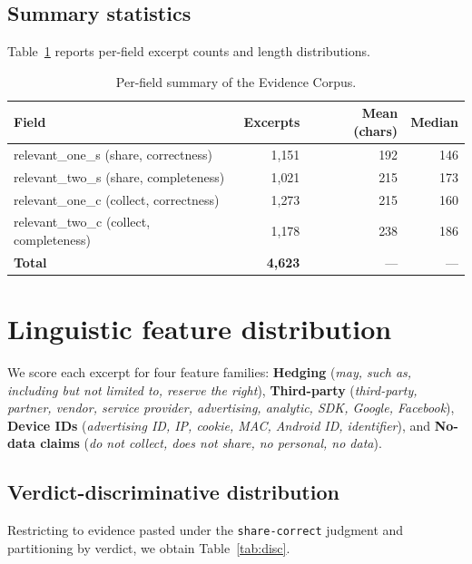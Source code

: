 \documentclass[11pt,a4paper]{article}
\begin{document}
\subsection{Summary statistics}
Table~\ref{tab:corpus} reports per-field excerpt counts and length
distributions.

\begin{table}[t]
\centering\small
\caption{Per-field summary of the Evidence Corpus.}
\label{tab:corpus}
\begin{tabular}{lrrr}
\toprule
Field & Excerpts & Mean (chars) & Median \\
\midrule
relevant\_one\_s (share, correctness)  & 1{,}151 & 192 & 146 \\
relevant\_two\_s (share, completeness) & 1{,}021 & 215 & 173 \\
relevant\_one\_c (collect, correctness)  & 1{,}273 & 215 & 160 \\
relevant\_two\_c (collect, completeness) & 1{,}178 & 238 & 186 \\
\midrule
\textbf{Total}                          & \textbf{4{,}623} & --- & --- \\
\bottomrule
\end{tabular}
\end{table}

\section{Linguistic feature distribution}
We score each excerpt for four feature families:
\textbf{Hedging} (\emph{may, such as, including but not limited to,
reserve the right}),
\textbf{Third-party} (\emph{third-party, partner, vendor, service
provider, advertising, analytic, SDK, Google, Facebook}),
\textbf{Device IDs} (\emph{advertising ID, IP, cookie, MAC, Android ID,
identifier}),
and \textbf{No-data claims}
(\emph{do not collect, does not share, no personal, no data}).

\subsection{Verdict-discriminative distribution}
Restricting to evidence pasted under the \texttt{share-correct} judgment
and partitioning by verdict, we obtain Table~\ref{tab:disc}.
\end{document}
